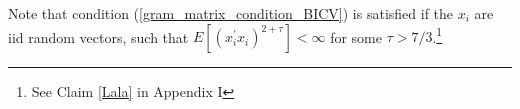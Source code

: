 \documentclass[Research_Module_ES.tex]{subfiles}
\begin{document}
Note that condition (\ref{gram_matrix_condition_BICV}) is satisfied if the $x_i$ are iid random vectors, such that $E[(x_i^\prime x_i)^{2+\tau}]<\infty$ for some $\tau>7/3$.\footnote{See Claim \ref{Lala} in Appendix I}

\end{document}
